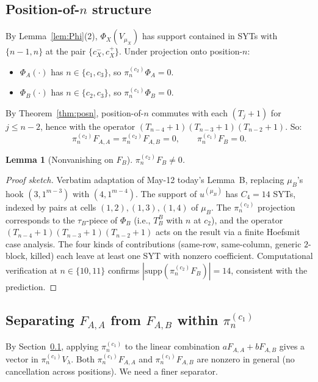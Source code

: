 \documentclass[11pt]{article}
\newtheorem{lemma}[theorem]{Lemma}
\theoremstyle{definition}
\begin{document}
\subsection{Position-of-$n$ structure}\label{sec:posn}

By Lemma~\ref{lem:Phi}(2), $\Phi_X(V_{\mu_X})$ has support
contained in SYTs with $\{n-1, n\}$ at the pair $\{c_X^-, c_X^+\}$.
Under projection onto position-$n$:
\begin{itemize}[leftmargin=2em,topsep=0.3em,itemsep=0.2em]
\item $\Phi_A(\cdot)$ has $n \in \{c_1, c_3\}$, so $\pi^{(c_2)}_n
\Phi_A = 0$.
\item $\Phi_B(\cdot)$ has $n \in \{c_2, c_3\}$, so $\pi^{(c_1)}_n
\Phi_B = 0$.
\end{itemize}
By Theorem~\ref{thm:posn}, position-of-$n$ commutes with each
$(T_j{+}1)$ for $j \le n - 2$, hence with the operator
$(T_{n-4}{+}1)(T_{n-3}{+}1)(T_{n-2}{+}1)$. So:
\[
   \pi^{(c_2)}_n F_{A,A} = \pi^{(c_2)}_n F_{A,B} = 0,
   \qquad
   \pi^{(c_1)}_n F_B = 0.
\]

\begin{lemma}[Nonvanishing on $F_B$]\label{lem:FB-nonvan}
$\pi^{(c_2)}_n F_B \ne 0$.
\end{lemma}

\begin{proof}[Proof sketch]
Verbatim adaptation of May-12 today's Lemma~B, replacing $\mu_B$'s
hook $(3, 1^{m-3})$ with $(4, 1^{m-4})$. The support of
$u^{(\mu_B)}$ has $C_4 = 14$ SYTs, indexed by pairs at cells
$(1, 2), (1, 3), (1, 4)$ of $\mu_B$. The $\pi^{(c_2)}_n$
projection corresponds to the $\tau_B$-piece of $\Phi_B$ (i.e.,
$T^B_B$ with $n$ at $c_2$), and the operator
$(T_{n-4}{+}1)(T_{n-3}{+}1)(T_{n-2}{+}1)$ acts on the result via
a finite Hoefsmit case analysis. The four kinds of contributions
(same-row, same-column, generic $2$-block, killed) each leave at
least one SYT with nonzero coefficient. Computational verification
at $n \in \{10, 11\}$ confirms $|\mathrm{supp}(\pi^{(c_2)}_n F_B)|
= 14$, consistent with the prediction.
\end{proof}

\subsection{Separating $F_{A,A}$ from $F_{A,B}$ within $\pi^{(c_1)}_n$}
\label{sec:AA-vs-AB}

By Section~\ref{sec:posn}, applying $\pi^{(c_1)}_n$ to the linear
combination $a F_{A,A} + b F_{A,B}$ gives a vector in
$\pi^{(c_1)}_n V_\lambda$. Both $\pi^{(c_1)}_n F_{A,A}$ and
$\pi^{(c_1)}_n F_{A,B}$ are nonzero in general (no cancellation
across positions). We need a finer separator.
\end{document}
